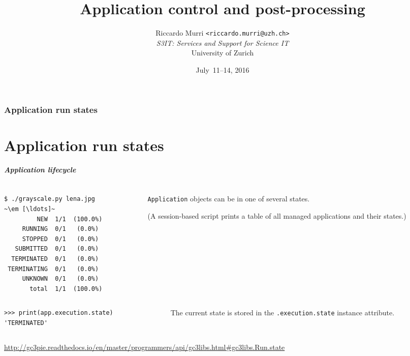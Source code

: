 \documentclass[english,serif,mathserif,xcolor=pdftex,dvipsnames,table]{beamer}
\title[Post-processing]{%
  Application control and post-processing
}
\author[R. Murri, S3IT UZH]{%
  Riccardo Murri \texttt{<riccardo.murri@uzh.ch>}
  \\[1ex]
  \emph{S3IT: Services and Support for Science IT}
  \\[1ex]
  University of Zurich
}
\date{July~11--14, 2016}
\begin{document}
\maketitle


\section{Application run states}
\part{Application run states}

\begin{frame}[fragile]
\frametitle{Application lifecycle}

\begin{columns}[c]
  \begin{column}{0.5\textwidth}
\begin{lstlisting}[basicstyle=\footnotesize\ttfamily,keywordstyle=\normalfont]
$ ./grayscale.py lena.jpg
~\em [\ldots]~
         NEW  1/1  (100.0%)
     RUNNING  0/1   (0.0%)
     STOPPED  0/1   (0.0%)
   SUBMITTED  0/1   (0.0%)
  TERMINATED  0/1   (0.0%)
 TERMINATING  0/1   (0.0%)
     UNKNOWN  0/1   (0.0%)
       total  1/1  (100.0%)
\end{lstlisting}%
  \end{column}
  \begin{column}{0.5\textwidth}
    \raggedleft
    \texttt{Application} objects can be in one of several states.

    \+
    (A session-based script prints a table of all managed applications and their states.)
  \end{column}
\end{columns}

\+
\begin{columns}[c]
  \begin{column}{0.5\textwidth}
\begin{lstlisting}[basicstyle=\footnotesize\ttfamily]
>>> print(app.execution.state)
'TERMINATED'
\end{lstlisting}
  \end{column}
  \begin{column}{0.5\textwidth}
    \raggedleft
    The current state is stored in the \texttt{.execution.state} instance attribute.
  \end{column}
\end{columns}

\+
\begin{references}
  \tiny
  \url{http://gc3pie.readthedocs.io/en/master/programmers/api/gc3libs.html#gc3libs.Run.state}
\end{references}
\end{frame}
\end{document}
